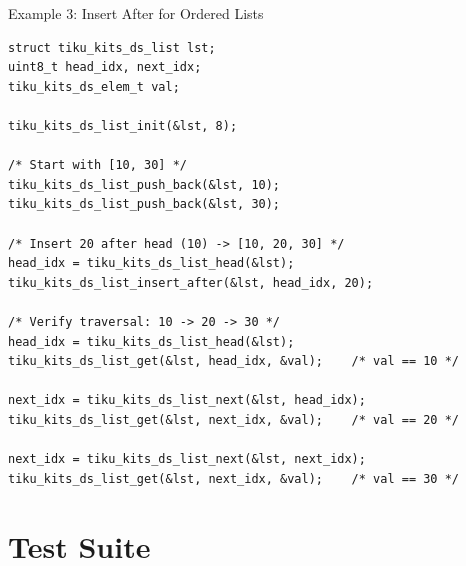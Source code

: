 \documentclass[aspectratio=169, 10pt]{beamer}
\begin{document}
\begin{frame}[fragile]{Example 3: Insert After for Ordered Lists}
\begin{lstlisting}[style=cstyle,
  title={Building an ordered list with insert\_after}]
struct tiku_kits_ds_list lst;
uint8_t head_idx, next_idx;
tiku_kits_ds_elem_t val;

tiku_kits_ds_list_init(&lst, 8);

/* Start with [10, 30] */
tiku_kits_ds_list_push_back(&lst, 10);
tiku_kits_ds_list_push_back(&lst, 30);

/* Insert 20 after head (10) -> [10, 20, 30] */
head_idx = tiku_kits_ds_list_head(&lst);
tiku_kits_ds_list_insert_after(&lst, head_idx, 20);

/* Verify traversal: 10 -> 20 -> 30 */
head_idx = tiku_kits_ds_list_head(&lst);
tiku_kits_ds_list_get(&lst, head_idx, &val);    /* val == 10 */

next_idx = tiku_kits_ds_list_next(&lst, head_idx);
tiku_kits_ds_list_get(&lst, next_idx, &val);    /* val == 20 */

next_idx = tiku_kits_ds_list_next(&lst, next_idx);
tiku_kits_ds_list_get(&lst, next_idx, &val);    /* val == 30 */
\end{lstlisting}
\end{frame}

\section{Test Suite}
\end{document}
